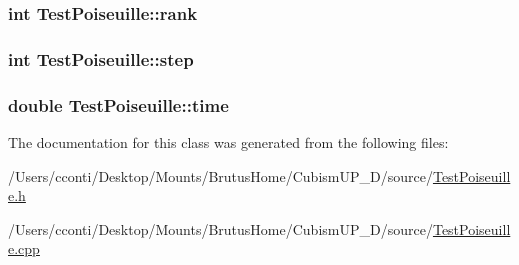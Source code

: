 \subsubsection[{rank}]{\setlength{\rightskip}{0pt plus 5cm}int Test\+Poiseuille\+::rank\hspace{0.3cm}{\ttfamily [protected]}}\label{class_test_poiseuille_a5d589cfd40e004bf1d43a774c6b4c872}
\hypertarget{class_test_poiseuille_a1849a5bb6d12f01b2bbf568c429315c0}{}
\subsubsection[{step}]{\setlength{\rightskip}{0pt plus 5cm}int Test\+Poiseuille\+::step\hspace{0.3cm}{\ttfamily [protected]}}\label{class_test_poiseuille_a1849a5bb6d12f01b2bbf568c429315c0}
\hypertarget{class_test_poiseuille_acdb73b1c2ed9990a25f8d312278f081f}{}
\subsubsection[{time}]{\setlength{\rightskip}{0pt plus 5cm}double Test\+Poiseuille\+::time\hspace{0.3cm}{\ttfamily [protected]}}\label{class_test_poiseuille_acdb73b1c2ed9990a25f8d312278f081f}


The documentation for this class was generated from the following files\+:\begin{DoxyCompactItemize}
\item 
/\+Users/cconti/\+Desktop/\+Mounts/\+Brutus\+Home/\+Cubism\+U\+P\+\_\+D/source/\hyperlink{_test_poiseuille_8h}{Test\+Poiseuille.\+h}\item 
/\+Users/cconti/\+Desktop/\+Mounts/\+Brutus\+Home/\+Cubism\+U\+P\+\_\+D/source/\hyperlink{_test_poiseuille_8cpp}{Test\+Poiseuille.\+cpp}\end{DoxyCompactItemize}
